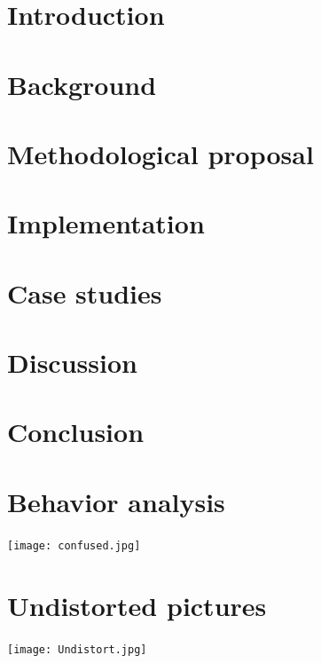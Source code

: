 \documentclass[10pt, a4paper, twocolumn]{article} %
\begin{document}
\setcounter{page}{1}

\section{Introduction}


\section{Background}


\section{Methodological proposal}


\section{Implementation}


\section{Case studies}


\section{Discussion}


\section{Conclusion}


\clearpage
\printbibliography[title={Bibliography}] %



\onecolumn

\begin{appendices}
\section{Behavior analysis}
\texttt{[image: confused.jpg]}

\section{Undistorted pictures}
\texttt{[image: Undistort.jpg]} 

\end{appendices}

\end{document}
